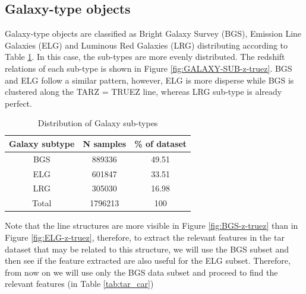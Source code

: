 \subsection{Galaxy-type objects}
Galaxy-type objects are classified as Bright Galaxy Survey (BGS), Emission Line Galaxies (ELG) and Luminous Red Galaxies (LRG) distributing according to Table \ref{tab:Galaxy-sub-types}. In this case, the sub-types are more evenly distributed. The redshift relations of each sub-type is shown in Figure \ref{fig:GALAXY-SUB-z-truez}. BGS and ELG follow a similar pattern, however, ELG is more disperse while BGS is clustered along the TARZ = TRUEZ line, whereas LRG sub-type is already perfect. 
\begin{table}[!h]
	\centering
	\begin{tabular}{c|c|c}
		Galaxy subtype & N samples  & \% of dataset  \\ 
		\hline 
		BGS & 889336 & 49.51 \\      
		ELG & 601847 & 33.51 \\  
		LRG & 305030 & 16.98 \\ 
		Total & 1796213 & 100 \\  
	\end{tabular} 
	\caption{Distribution of Galaxy sub-types}
	\label{tab:Galaxy-sub-types}
\end{table}

Note that the line structures are more visible in Figure \ref{fig:BGS-z-truez} than in Figure \ref{fig:ELG-z-truez}, therefore, to extract the relevant features in the tar dataset that may be related to this structure, we will use the BGS subset and then see if the feature extracted are also useful for the ELG subset. Therefore, from now on we will use only the BGS data subset and proceed to find the relevant features (in Table \ref{tab:tar_car})


